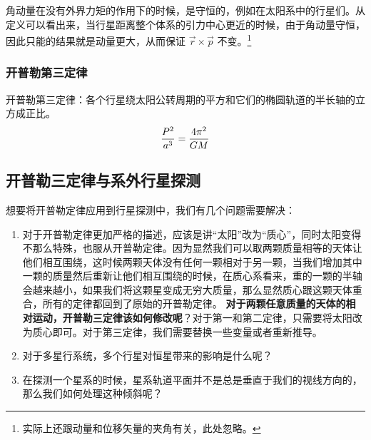 \documentclass[letterpaper,10pt,english]{sphinxmanual}
\begin{document}
角动量在没有外界力矩的作用下的时候，是守恒的，例如在太阳系中的行星们。从定义可以看出来，当行星距离整个体系的引力中心更近的时候，由于角动量守恒，因此只能的结果就是动量更大，从而保证 \(\vec r\times \vec p\) 不变。\footnote{
实际上还跟动量和位移矢量的夹角有关，此处忽略。
}


\subsubsection{开普勒第三定律}
\label{orbits:id9}
开普勒第三定律：各个行星绕太阳公转周期的平方和它们的椭圆轨道的半长轴的立方成正比。
\begin{gather}
\begin{split}\frac{P^2}{a^3} = \frac{4\pi^2}{GM}\end{split}\notag
\end{gather}

\subsection{开普勒三定律与系外行星探测}
\label{orbits:id10}
想要将开普勒定律应用到行星探测中，我们有几个问题需要解决：
\begin{enumerate}
\item {} 
对于开普勒定律更加严格的描述，应该是讲“太阳”改为“质心”，同时太阳变得不那么特殊，也服从开普勒定律。因为显然我们可以取两颗质量相等的天体让他们相互围绕，这时候两颗天体没有任何一颗相对于另一颗，当我们增加其中一颗的质量然后重新让他们相互围绕的时候，在质心系看来，重的一颗的半轴会越来越小，如果我们将这颗星变成无穷大质量，那么显然质心跟这颗天体重合，所有的定律都回到了原始的开普勒定律。 \textbf{对于两颗任意质量的天体的相对运动，开普勒三定律该如何修改呢}？对于第一和第二定律，只需要将太阳改为质心即可。对于第三定律，我们需要替换一些变量或者重新推导。

\item {} 
对于多星行系统，多个行星对恒星带来的影响是什么呢？

\item {} 
在探测一个星系的时候，星系轨道平面并不是总是垂直于我们的视线方向的，那么我们如何处理这种倾斜呢？

\end{enumerate}
\end{document}
